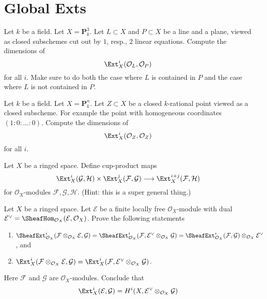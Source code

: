 \section{Global Exts}
\label{section-global-exts}

\begin{exercise}
\label{exercise-ext-line-plane-p3}
Let $k$ be a field. Let $X = \mathbf{P}^3_k$. Let $L \subset X$
and $P \subset X$ be a line and a plane, viewed as closed subschemes
cut out by $1$, resp., $2$ linear equations. Compute
the dimensions of
$$
\Ext^i_X(\mathcal{O}_L, \mathcal{O}_P)
$$
for all $i$.
Make sure to do both the case where $L$ is contained in $P$ and the
case where $L$ is not contained in $P$.
\end{exercise}

\begin{exercise}
\label{exercise-ext-point}
Let $k$ be a field. Let $X = \mathbf{P}^n_k$. Let $Z \subset X$
be a closed $k$-rational point viewed as a closed subscheme.
For example the point with homogeneous coordinates
$(1 : 0 : \ldots : 0)$. Compute the dimensions of
$$
\Ext^i_X(\mathcal{O}_Z, \mathcal{O}_Z)
$$
for all $i$.
\end{exercise}

\begin{exercise}
\label{exercise-ext-pairings}
Let $X$ be a ringed space. Define cup-product maps
$$
\Ext^i_X(\mathcal{G}, \mathcal{H})
\times
\Ext^j_X(\mathcal{F}, \mathcal{G})
\longrightarrow
\Ext^{i + j}_X(\mathcal{F}, \mathcal{H})
$$
for $\mathcal{O}_X$-modules $\mathcal{F}, \mathcal{G}, \mathcal{H}$.
(Hint: this is a super general thing.)
\end{exercise}

\begin{exercise}
\label{exercise-move-out-locally-free}
Let $X$ be a ringed space. Let $\mathcal{E}$ be a finite locally free
$\mathcal{O}_X$-module with dual
$\mathcal{E}^\vee = \SheafHom_{\mathcal{O}_X}(\mathcal{E}, \mathcal{O}_X)$.
Prove the following statements
\begin{enumerate}
\item $\SheafExt^i_{\mathcal{O}_X}(
\mathcal{F} \otimes_{\mathcal{O}_X} \mathcal{E}, \mathcal{G}) =
\SheafExt^i_{\mathcal{O}_X}(
\mathcal{F},
\mathcal{E}^\vee \otimes_{\mathcal{O}_X} \mathcal{G}) =
\SheafExt^i_{\mathcal{O}_X}(
\mathcal{F}, \mathcal{G}) \otimes_{\mathcal{O}_X} \mathcal{E}^\vee$, and
\item $\Ext^i_X(
\mathcal{F} \otimes_{\mathcal{O}_X} \mathcal{E}, \mathcal{G}) =
\Ext^i_X(\mathcal{F},
\mathcal{E}^\vee \otimes_{\mathcal{O}_X} \mathcal{G})$.
\end{enumerate}
Here $\mathcal{F}$ and $\mathcal{G}$ are $\mathcal{O}_X$-modules. Conclude
that
$$
\Ext^i_X(\mathcal{E}, \mathcal{G}) =
H^i(X, \mathcal{E}^\vee \otimes_{\mathcal{O}_X} \mathcal{G})
$$
\end{exercise}

